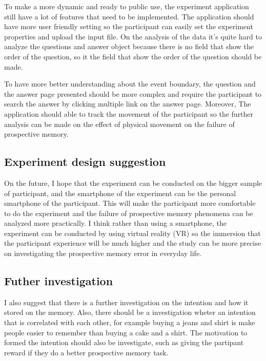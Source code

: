 To make a more dynamic and ready to public use, the experiment application still have a lot of features that need to be implemented.
The application should have more user friendly setting so the participant can easily set the experiment properties and upload the input file.
On the analysis of the data it's quite hard to analyze the questions and answer object because there is no field that show the order of the question, so
it the field that show the order of the question should be made.

To have more better understanding about the event boundary, the question and the answer page presented should be more complex and require
the participant to search the answer by clicking multiple link on the answer page.
Moreover, The application should able to track the movement of the participant so the further analysis can be made on the effect of physical movement
on the failure of prospective memory.


\subsection{Experiment design suggestion}
On the future, I hope that the experiment can be conducted on the bigger sample of participant, and the smartphone of the experiment can be the
personal smartphone of the participant. This will make the participant more comfortable to do the experiment and the failure of prospective memory
phenomena can be analyzed more practically.
I think rather than using a smartphone, the experiment can be conducted by using virtual reality (VR) so the immersion that the participant experience
will be much higher and the study can be more precise on investigating the prospective memory error in everyday life.

\subsection{Futher investigation}
I also suggest that there is a further investigation on the intention and how it stored on the memory. Also, there should be a investigation
wheter an intention that is correlated with each other, for example buying a jeans and shirt is make people easier to remember than
buying a cake and a shirt. The motivation to formed the intention should also be investigate, such as giving the partipant reward if they do
a better prospective memory task.


